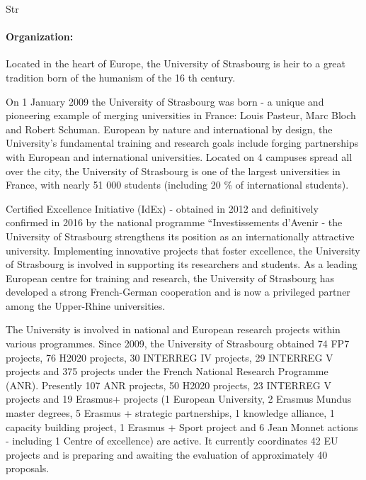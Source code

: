 \begin{sitedescription}{Str}

\paragraph{Organization:}

Located in the heart of Europe, the University of Strasbourg is heir to a great tradition born of
the humanism of the 16 th century.

On 1 January 2009 the University of Strasbourg was born - a unique and pioneering
example of merging universities in France: Louis Pasteur, Marc Bloch and Robert Schuman.
European by nature and international by design, the University’s fundamental training and
research goals include forging partnerships with European and international universities.
Located on 4 campuses spread all over the city, the University of Strasbourg is one of the
largest universities in France, with nearly 51 000 students (including 20 \% of international
students).

Certified Excellence Initiative (IdEx) - obtained in 2012 and definitively confirmed in 2016
by the national programme “Investissements d’Avenir - the University of Strasbourg
strengthens its position as an internationally attractive university. Implementing innovative
projects that foster excellence, the University of Strasbourg is involved in supporting its
researchers and students.
As a leading European centre for training and research, the University of Strasbourg has
developed a strong French-German cooperation and is now a privileged partner among the
Upper-Rhine universities.

The University is involved in national and European research projects within various
programmes. Since 2009, the University of Strasbourg obtained 74 FP7 projects, 76 H2020
projects, 30 INTERREG IV projects, 29 INTERREG V projects and 375 projects under the
French National Research Programme (ANR). Presently 107 ANR projects, 50 H2020
projects, 23 INTERREG V projects and 19 Erasmus+ projects (1 European University, 2
Erasmus Mundus master degrees, 5 Erasmus + strategic partnerships, 1 knowledge alliance, 1
capacity building project, 1 Erasmus + Sport project and 6 Jean Monnet actions - including 1
Centre of excellence) are active. It currently coordinates 42 EU projects and is preparing and
awaiting the evaluation of approximately 40 proposals.


\end{sitedescription}
